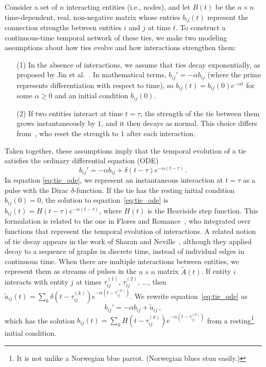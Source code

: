 \documentclass[journal,transmag]{IEEEtran}
\begin{document}
Consider a set of $n$ interacting entities (i.e., nodes), and let $B(t)$ be the $n
\times n$ time-dependent, real, non-negative matrix whose entries
$b_{ij}(t)$ represent the connection strengths between entities $i$ and $j$
at time $t$.  To construct a continuous-time temporal network of these ties,
we make two modeling assumptions about how ties evolve and how
interactions strengthen them:
\begin{enumerate}
\item[(1)]{In the absence of interactions, we assume that ties decay
  exponentially, as proposed by {Jin et
    al.}~\cite{Jin2001}. In mathematical terms, $b_{ij}'=-\alpha
  b_{ij}$ (where the prime represents differentiation with respect to
  time), so $b_{ij}(t)=b_{ij}(0)e^{-\alpha t}$ for some $\alpha \geq
  0$ and an initial condition $b_{ij}(0)$.}
\item[(2)]{If two entities interact at time $t=\tau$, the strength of the tie
  between them grows instantaneously by $1$, and it then decays as normal. This
  choice differs from~\cite{Jin2001}, who reset the strength to $1$
  after each interaction.}
\end{enumerate}
Taken together, these assumptions imply that the temporal evolution
of a tie satisfies the ordinary differential equation (ODE)
\begin{equation}
	  b_{ij}' = -\alpha b_{ij} + \delta(t - \tau)e^{-\alpha(t - \tau)}\,.
  \label{eq:tie_ode}
\end{equation}
In equation \eqref{eq:tie_ode}, we represent an instantaneous
interaction at $t=\tau$ as a pulse with the Dirac
$\delta$-function. If the tie has the resting initial condition
$b_{ij}(0)=0$, the solution to equation~\eqref{eq:tie_ode} is
$b_{ij}(t) = H(t-\tau)e^{-\alpha(t-\tau)}$, where $H(t)$ is the
Heaviside step function. This formulation is related to the one in
Flores and Romance~\cite{Flores2018}, who integrated over functions
that represent the temporal evolution of interactions. A related notion of tie decay appears in the
  work of Sharan and Neville~\cite{Sharan2007}, although
  they applied decay to a sequence of graphs in discrete time,
  instead of individual edges in continuous time. When there are multiple
interactions between entities, we represent them as streams of pulses in
the $n\times n$ matrix $\widetilde{A}(t)$. If entity $i$ interacts with
entity $j$ at times $\tau_{ij}^{\left(1\right)},\,
\tau_{ij}^{\left(2\right)}, \,\ldots$, then $\tilde{a}_{ij}(t) =
\sum_{k}\delta(t-\tau_{ij}^{\left(k\right)})e^{-\alpha(t -
  \tau_{ij}^{\left(k\right)})}$.  We rewrite
equation~\eqref{eq:tie_ode} as
\begin{equation}
  	b_{ij}' = -\alpha b_{ij} + \tilde{a}_{ij}\,,
  \label{eq:tie_ode2}
\end{equation}
 which has the solution $b_{ij}(t) = \sum_k
 H(t-\tau_{ij}^{\left(k\right)})e^{-\alpha
   (t-\tau_{ij}^{\left(k\right)})}$ from a resting\footnote{It is not
   unlike a Norwegian blue parrot. (Norwegian blues stun easily.)}
 initial condition.
\end{document}
